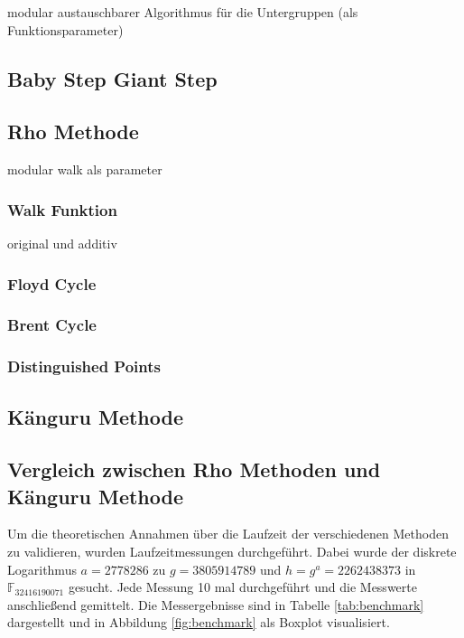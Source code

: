 \documentclass{scrartcl}
\begin{document}
modular austauschbarer Algorithmus für die Untergruppen
(als Funktionsparameter)

\cite{Pohlig1978}

\subsection{Baby Step Giant Step}
\label{sec:baby_step_giant_step}

\cite{Galbraith2012}

\subsection{Rho Methode}
\label{sec:rho}

modular walk als parameter

\cite{Galbraith2012}

\subsubsection{Walk Funktion}
\label{sec:walk_funktion}
original und additiv

\subsubsection{Floyd Cycle}
\label{sec:floyd_cycle}


\subsubsection{Brent Cycle}
\label{sec:brent_cycle}

\cite{Brent1980}

\subsubsection{Distinguished Points}
\label{sec:distinguished_points}


\cite{VanOorschot1999}

\subsection{Känguru Methode}
\label{sec:kaenguru}

\subsection{Vergleich zwischen Rho Methoden und Känguru Methode}
Um die theoretischen Annahmen über die Laufzeit der verschiedenen Methoden
zu validieren, wurden Laufzeitmessungen durchgeführt.
Dabei wurde der diskrete Logarithmus \( a = 2778286 \) zu \( g = 3805914789 \)
und \(h = g^a = 2262438373 \) in \( \mathbb{F}_{32416190071} \) gesucht.
Jede Messung 10 mal durchgeführt und die Messwerte anschließend gemittelt.
Die Messergebnisse sind in Tabelle \ref{tab:benchmark} dargestellt und
in Abbildung \ref{fig:benchmark} als Boxplot visualisiert.
\end{document}

